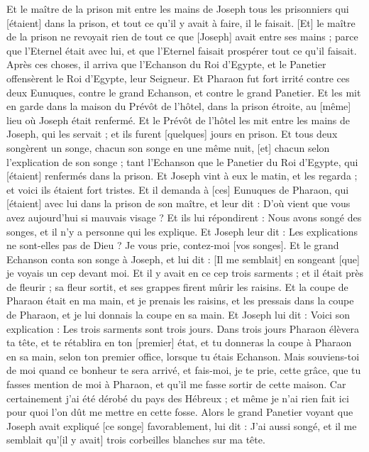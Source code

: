 \begin{multicols}{2}
Et le maître de la prison mit entre les mains de Joseph tous les prisonniers qui [étaient] dans la prison, et tout ce qu'il y avait à faire, il le faisait.
[Et] le maître de la prison ne revoyait rien de tout ce que [Joseph] avait entre ses mains ; parce que l'Eternel était avec lui, et que l'Eternel faisait prospérer tout ce qu'il faisait.
\VerseOne{}Après ces choses, il arriva que l'Echanson du Roi d'Egypte, et le Panetier offensèrent le Roi d'Egypte, leur Seigneur.
Et Pharaon fut fort irrité contre ces deux Eunuques, contre le grand Echanson, et contre le grand Panetier.
Et les mit en garde dans la maison du Prévôt de l'hôtel, dans la prison étroite, au [même] lieu où Joseph était renfermé.
Et le Prévôt de l'hôtel les mit entre les mains de Joseph, qui les servait ; et ils furent [quelques] jours en prison.
Et tous deux songèrent un songe, chacun son songe en une même nuit, [et] chacun selon l'explication de son songe ; tant l'Echanson que le Panetier du Roi d'Egypte, qui [étaient] renfermés dans la prison.
Et Joseph vint à eux le matin, et les regarda ; et voici ils étaient fort tristes.
Et il demanda à [ces] Eunuques de Pharaon, qui [étaient] avec lui dans la prison de son maître, et leur dit : D'où vient que vous avez aujourd'hui si mauvais visage ?
Et ils lui répondirent : Nous avons songé des songes, et il n'y a personne qui les explique. Et Joseph leur dit : Les explications ne sont-elles pas de Dieu ? Je vous prie, contez-moi [vos songes].
Et le grand Echanson conta son songe à Joseph, et lui dit : [Il me semblait] en songeant [que] je voyais un cep devant moi.
Et il y avait en ce cep trois sarments ; et il était près de fleurir ; sa fleur sortit, et ses grappes firent mûrir les raisins.
Et la coupe de Pharaon était en ma main, et je prenais les raisins, et les pressais dans la coupe de Pharaon, et je lui donnais la coupe en sa main.
Et Joseph lui dit : Voici son explication : Les trois sarments sont trois jours.
Dans trois jours Pharaon élèvera ta tête, et te rétablira en ton [premier] état, et tu donneras la coupe à Pharaon en sa main, selon ton premier office, lorsque tu étais Echanson.
Mais souviens-toi de moi quand ce bonheur te sera arrivé, et fais-moi, je te prie, cette grâce, que tu fasses mention de moi à Pharaon, et qu'il me fasse sortir de cette maison.
Car certainement j'ai été dérobé du pays des Hébreux ; et même je n'ai rien fait ici pour quoi l'on dût me mettre en cette fosse.
Alors le grand Panetier voyant que Joseph avait expliqué [ce songe] favorablement, lui dit : J'ai aussi songé, et il me semblait qu'[il y avait] trois corbeilles blanches sur ma tête.

\end{multicols}
